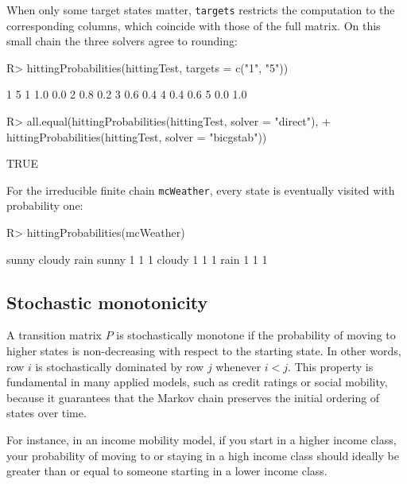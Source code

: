 \documentclass[
  nojss]{jss}
\begin{document}
When only some target states matter, \texttt{targets} restricts the computation to
the corresponding columns, which coincide with those of the full matrix. On this
small chain the three solvers agree to rounding:

\begin{CodeChunk}
\begin{CodeInput}
R> hittingProbabilities(hittingTest, targets = c("1", "5"))
\end{CodeInput}
\begin{CodeOutput}
    1   5
1 1.0 0.0
2 0.8 0.2
3 0.6 0.4
4 0.4 0.6
5 0.0 1.0
\end{CodeOutput}
\begin{CodeInput}
R> all.equal(hittingProbabilities(hittingTest, solver = "direct"),
+           hittingProbabilities(hittingTest, solver = "bicgstab"))
\end{CodeInput}
\begin{CodeOutput}
[1] TRUE
\end{CodeOutput}
\end{CodeChunk}

For the irreducible finite chain \texttt{mcWeather}, every state is eventually visited
with probability one:

\begin{CodeChunk}
\begin{CodeInput}
R> hittingProbabilities(mcWeather)
\end{CodeInput}
\begin{CodeOutput}
       sunny cloudy rain
sunny      1      1    1
cloudy     1      1    1
rain       1      1    1
\end{CodeOutput}
\end{CodeChunk}

\subsection{Stochastic monotonicity}\label{stochastic-monotonicity}

A transition matrix \(P\) is stochastically monotone if the probability of moving to higher states is non-decreasing with respect to the starting state.
In other words, row \(i\) is stochastically dominated by row \(j\) whenever \(i < j\).
This property is fundamental in many applied models, such as credit ratings or social mobility,
because it guarantees that the Markov chain preserves the initial ordering of states over time.

For instance, in an income mobility model, if you start in a higher income class,
your probability of moving to or staying in a high income class should ideally be greater than or equal to someone starting in a lower income class.
\end{document}
